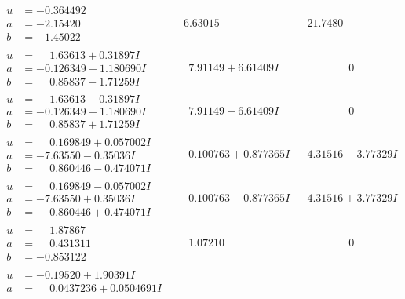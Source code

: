 \documentclass[1p]{elsarticle_modified}
\theoremstyle{definition}
\begin{document}
$$\begin{array}{c|c|c}
\begin{aligned}
u &= -0.364492\phantom{ +0.000000I} \\
a &= -2.15420\phantom{ +0.000000I} \\
b &= -1.45022\phantom{ +0.000000I}\end{aligned}
 & -6.63015\phantom{ +0.000000I} & -21.7480\phantom{ +0.000000I} \\ \hline\begin{aligned}
u &= \phantom{-}1.63613 + 0.31897 I \\
a &= -0.126349 + 1.180690 I \\
b &= \phantom{-}0.85837 - 1.71259 I\end{aligned}
 & \phantom{-}7.91149 + 6.61409 I & \phantom{-0.000000 } 0 \\ \hline\begin{aligned}
u &= \phantom{-}1.63613 - 0.31897 I \\
a &= -0.126349 - 1.180690 I \\
b &= \phantom{-}0.85837 + 1.71259 I\end{aligned}
 & \phantom{-}7.91149 - 6.61409 I & \phantom{-0.000000 } 0 \\ \hline\begin{aligned}
u &= \phantom{-}0.169849 + 0.057002 I \\
a &= -7.63550 - 0.35036 I \\
b &= \phantom{-}0.860446 - 0.474071 I\end{aligned}
 & \phantom{-}0.100763 + 0.877365 I & -4.31516 - 3.77329 I \\ \hline\begin{aligned}
u &= \phantom{-}0.169849 - 0.057002 I \\
a &= -7.63550 + 0.35036 I \\
b &= \phantom{-}0.860446 + 0.474071 I\end{aligned}
 & \phantom{-}0.100763 - 0.877365 I & -4.31516 + 3.77329 I \\ \hline\begin{aligned}
u &= \phantom{-}1.87867\phantom{ +0.000000I} \\
a &= \phantom{-}0.431311\phantom{ +0.000000I} \\
b &= -0.853122\phantom{ +0.000000I}\end{aligned}
 & \phantom{-}1.07210\phantom{ +0.000000I} & \phantom{-0.000000 } 0 \\ \hline\begin{aligned}
u &= -0.19520 + 1.90391 I \\
a &= \phantom{-}0.0437236 + 0.0504691 I \\

\end{aligned}
\end{array}$$
\end{document}
